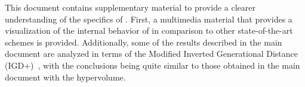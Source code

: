 This document contains supplementary material to provide a clearer understanding of the 
specifics of \VSDMOEA{}.
%
First, a multimedia material that provides a visualization of the internal behavior
of \VSDMOEA{} in comparison to other state-of-the-art schemes is provided.
%
Additionally, some of the results described in the main document are analyzed in terms
of the Modified Inverted Generational Distance (IGD+)~\cite{ishibuchi2015modified}, 
with the conclusions being quite similar to those obtained in the main document with
the hypervolume.
